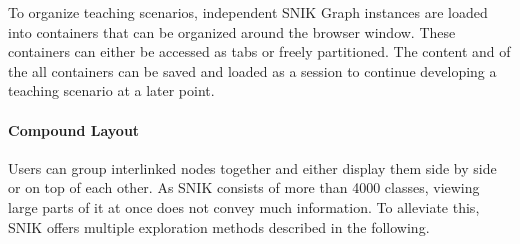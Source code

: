 \documentclass{IOS-Book-Article}     %
\begin{document}
To organize teaching scenarios, independent SNIK Graph instances are loaded into containers\footnotemark{} that can be organized around the browser window.
These containers can either be accessed as tabs or freely partitioned.%
The content and of the all containers can be saved and loaded as a session to continue developing a teaching scenario at a later point.


\paragraph{Compound Layout}


Users can group interlinked nodes together and either display them side by side or on top of each other.%
As SNIK consists of more than 4000 classes, viewing large parts of it at once does not convey much information.%
To alleviate this, SNIK offers multiple exploration methods described in the following.
\end{document}
